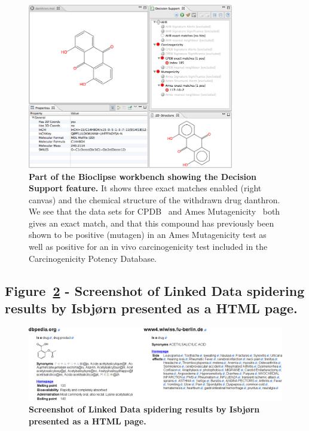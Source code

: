 \documentclass[10pt]{bmc_article}
\newenvironment{bmcformat}{\fussy\setboolean{publ}{true}}{\fussy}
\begin{document}
\begin{bmcformat}
\begin{figure}[!hb]
\begin{center}
	\includegraphics[width=9cm]{danthron-ds.png}
\caption{\textbf{Part of the Bioclipse workbench showing the Decision Support feature.} It shows three exact matches enabled (right canvas) and the chemical structure of the withdrawn drug danthron. We see that the data sets for CPDB~\cite{Fitzpatrick:2008dp} and Ames Mutagenicity~\cite{Kazius:2005pv} both gives an exact match, and that this compound has previously been shown to be positive (mutagen) in an Ames Mutagenicity test as well as positive for an in vivo carcinogenicity test included in the Carcinogenicity Potency Database.}
\label{fig:danth-ds}
\end{center}
\end{figure}

\newpage

\subsection*{Figure~\ref{fig:isbjorn} - Screenshot of Linked Data spidering results by Isbjørn presented as a HTML page.}

\begin{figure}[!hb]
\begin{center}
	\includegraphics[width=14cm]{isbjornMerged.png}
\caption{\textbf{Screenshot of Linked Data spidering results by Isbjørn presented as a HTML page.}}
\label{fig:isbjorn}
\end{center}
\end{figure}



\end{bmcformat}
\end{document}
